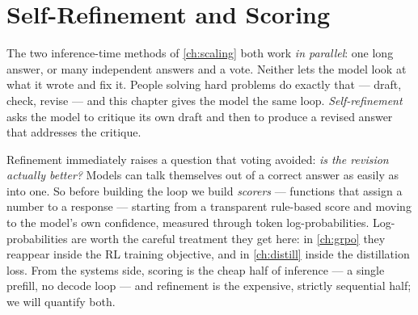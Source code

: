 \chapter{Self-Refinement and Scoring}\label{ch:refine}


The two inference-time methods of \cref{ch:scaling} both work \emph{in parallel}: one long answer, or
many independent answers and a vote. Neither lets the model look at what it wrote and fix it. People
solving hard problems do exactly that --- draft, check, revise --- and this chapter gives the model
the same loop. \emph{Self-refinement} asks the model to critique its own draft and then to produce a
revised answer that addresses the critique.

Refinement immediately raises a question that voting avoided: \emph{is the revision actually
better?} Models can talk themselves out of a correct answer as easily as into one. So before building
the loop we build \emph{scorers} --- functions that assign a number to a response --- starting from
a transparent rule-based score and moving to the model's own confidence, measured through token
log-probabilities. Log-probabilities are worth the careful treatment they get here: in
\cref{ch:grpo} they reappear inside the RL training objective, and in \cref{ch:distill} inside the
distillation loss. From the systems side, scoring is the cheap half of inference --- a single
prefill, no decode loop --- and refinement is the expensive, strictly sequential half; we will
quantify both.

